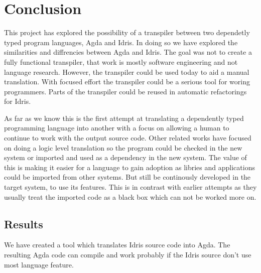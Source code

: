 \chapter{Conclusion}



This project has explored the possibility of a transpiler between two
dependetly typed program languages, Agda and Idris. In doing so we have
explored the similarities and diffrencies between Agda and Idris. The goal was
not to create a fully functional transpiler, that work is mostly software
engineering and not language research. However, the transpiler could be used
today to aid a manual translation. With focused effort the transpiler could be
a serious tool for woring programmers. Parts of the transpiler could be reused
in automatic refactorings for Idris.

As far as we know this is the first attempt at translating a dependently typed
programming language into another with a focus on allowing a human to continue
to work with the output source code. 
Other related works have focused on doing a logic level translation so the
program could be checked in the new system or imported and used as
a dependency in the new system. The value of this is making it easier for
a language to gain adoption as libries and applications could be imported from
other systems. But still be continously developed in the target system, to use
its features. This is in contrast with earlier attempts as they usually treat
the imported code as a black box which can not be worked more on.


\section{Results}

We have created a tool which translates Idris source code into Agda. The
resulting Agda code can compile and work probably if the Idris source don't use
most language feature.

